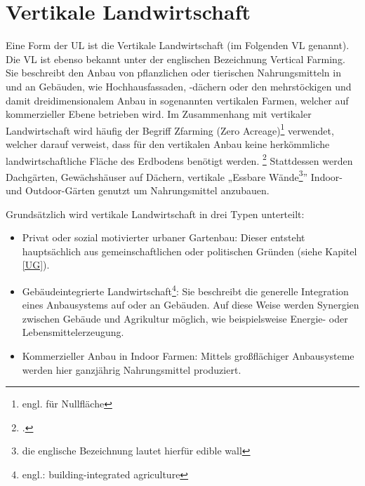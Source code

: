 \documentclass{scrartcl}
\begin{document}
\section{Vertikale Landwirtschaft}

Eine Form der UL ist die Vertikale Landwirtschaft (im Folgenden VL genannt). Die VL ist ebenso bekannt unter der englischen Bezeichnung Vertical Farming. Sie beschreibt den Anbau von pflanzlichen oder tierischen Nahrungsmitteln in und an Gebäuden, wie Hochhausfassaden, -dächern oder den mehrstöckigen und damit dreidimensionalem Anbau in sogenannten vertikalen Farmen, welcher auf kommerzieller Ebene betrieben wird. Im Zusammenhang mit vertikaler Landwirtschaft wird häufig der Begriff Zfarming (Zero Acreage)\footnote{engl. für Nullfläche} verwendet, welcher darauf verweist, dass für den vertikalen Anbau keine herkömmliche landwirtschaftliche Fläche des Erdbodens benötigt werden. \footcite{StadtischeFarming} Stattdessen werden Dachgärten, Gewächshäuser auf Dächern, vertikale „Essbare Wände\footnote{die englische Bezeichnung lautet hierfür edible wall}” Indoor- und Outdoor-Gärten genutzt um Nahrungsmittel anzubauen.

Grundsätzlich wird vertikale Landwirtschaft in drei Typen unterteilt:

\begin{itemize}
    \item Privat oder sozial motivierter urbaner Gartenbau: Dieser entsteht hauptsächlich aus gemeinschaftlichen oder politischen Gründen (siehe Kapitel \ref{UG}).
    \item Gebäudeintegrierte Landwirtschaft\footnote{engl.: building-integrated agriculture}: Sie beschreibt die generelle Integration eines Anbausystems auf oder an Gebäuden. Auf diese Weise werden Synergien zwischen Gebäude und Agrikultur möglich, wie beispielsweise Energie- oder Lebensmittelerzeugung.
    \item Kommerzieller Anbau in Indoor Farmen: Mittels großflächiger Anbausysteme werden hier ganzjährig Nahrungsmittel produziert.
\end{itemize}
    
  
\end{document}
